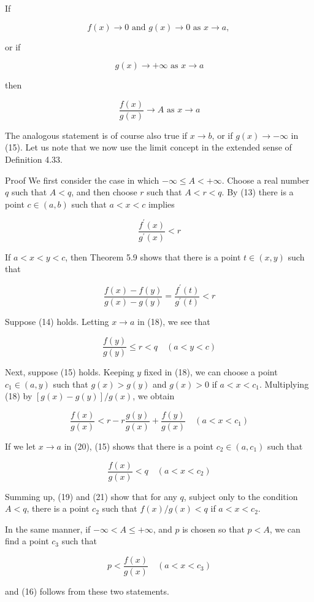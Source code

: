 \documentclass[10pt]{article}
\begin{document}
If

$$
f(x) \rightarrow 0 \text { and } g(x) \rightarrow 0 \text { as } x \rightarrow a \text {, }
$$

or if

$$
g(x) \rightarrow+\infty \text { as } x \rightarrow a
$$

then

$$
\frac{f(x)}{g(x)} \rightarrow A \text { as } x \rightarrow a
$$

The analogous statement is of course also true if $x \rightarrow b$, or if $g(x) \rightarrow-\infty$ in (15). Let us note that we now use the limit concept in the extended sense of Definition 4.33.

Proof We first consider the case in which $-\infty \leq A<+\infty$. Choose a real number $q$ such that $A<q$, and then choose $r$ such that $A<r<q$. By (13) there is a point $c \in(a, b)$ such that $a<x<c$ implies

$$
\frac{f^{\prime}(x)}{g^{\prime}(x)}<r
$$

If $a<x<y<c$, then Theorem 5.9 shows that there is a point $t \in(x, y)$ such that

$$
\frac{f(x)-f(y)}{g(x)-g(y)}=\frac{f^{\prime}(t)}{g^{\prime}(t)}<r
$$

Suppose (14) holds. Letting $x \rightarrow a$ in (18), we see that

$$
\frac{f(y)}{g(y)} \leq r<q \quad(a<y<c)
$$

Next, suppose (15) holds. Keeping $y$ fixed in (18), we can choose a point $c_{1} \in(a, y)$ such that $g(x)>g(y)$ and $g(x)>0$ if $a<x<c_{1}$. Multiplying (18) by $[g(x)-g(y)] / g(x)$, we obtain

$$
\frac{f(x)}{g(x)}<r-r \frac{g(y)}{g(x)}+\frac{f(y)}{g(x)} \quad\left(a<x<c_{1}\right)
$$

If we let $x \rightarrow a$ in (20), (15) shows that there is a point $c_{2} \in\left(a, c_{1}\right)$ such that

$$
\frac{f(x)}{g(x)}<q \quad\left(a<x<c_{2}\right)
$$

Summing up, (19) and (21) show that for any $q$, subject only to the condition $A<q$, there is a point $c_{2}$ such that $f(x) / g(x)<q$ if $a<x<c_{2}$.

In the same manner, if $-\infty<A \leq+\infty$, and $p$ is chosen so that $p<A$, we can find a point $c_{3}$ such that

$$
p<\frac{f(x)}{g(x)} \quad\left(a<x<c_{3}\right)
$$

and (16) follows from these two statements.
\end{document}
